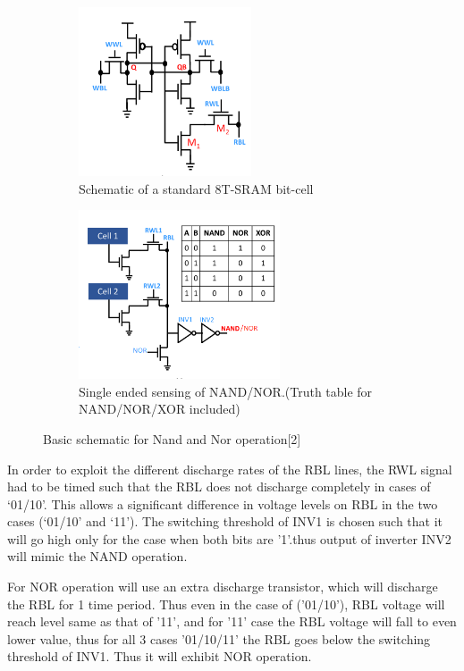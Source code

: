 \begin{figure}[h]
 
\begin{subfigure}{0.5\textwidth}
\includegraphics[width=0.9\linewidth, height=5cm]{1.PNG} 
\caption{ Schematic of a standard 8T-SRAM bit-cell}
\label{fig:subim1}
\end{subfigure}
\begin{subfigure}{0.5\textwidth}
\includegraphics[width=0.9\linewidth, height=5cm]{2.PNG}
\caption{Single ended sensing of NAND/NOR.(Truth table for NAND/NOR/XOR included)}
\label{fig:subim2}
\end{subfigure}
 
\caption{Basic schematic for Nand and Nor operation[2]}
\label{fig:image1}
\end{figure}

In order to exploit the different discharge rates of the RBL lines, the RWL signal had to be timed such that the RBL does not discharge completely in cases of ‘01/10’. This allows a significant difference in voltage levels on RBL in the two cases (‘01/10’ and ‘11’). The switching threshold of INV1 is  chosen such that it will go high only for
the case when both bits are '1’.thus output of inverter INV2 will mimic the NAND operation.

For NOR operation will use an extra discharge transistor, which will discharge the RBL for 1 time period. Thus even in the case of ('01/10'), RBL voltage will reach level same as that of '11', and for '11' case the RBL voltage will fall to even lower value, thus for all 3 cases '01/10/11' the RBL goes below the switching threshold of INV1. Thus it will exhibit NOR operation.

